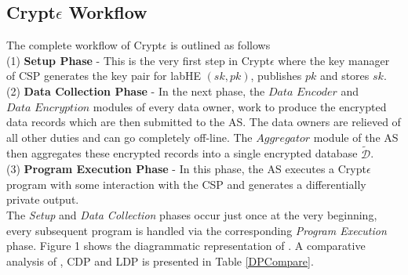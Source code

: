 \subsection{Crypt$\epsilon$ Workflow}
The complete workflow of Crypt$\epsilon$ is outlined as follows\\(1) \textbf{ Setup Phase} - This is the very first step in Crypt$\epsilon$ where the key manager of \textsf{CSP} generates the key pair for labHE $(sk,pk)$, publishes $pk$ and stores $sk$. \\(2) \textbf{ Data Collection Phase }- In the next phase, the $\textit{Data 
Encoder}$ and $\textit{Data Encryption}$ modules of every data owner, work to produce the encrypted data records which are then submitted to the \textsf{AS}. The data owners are relieved of all other duties and can go completely off-line. The $\textit{Aggregator}$ module of the \textsf{AS} then aggregates these encrypted records into a single encrypted database $\boldsymbol{\tilde{\mathcal{D}}}$. \\(3) \textbf{ Program Execution Phase} - In this phase, the \textsf{AS} executes a Crypt$\epsilon$ program with some interaction with the \textsf{CSP}  and generates a differentially private output.  \\
The \emph{Setup} and \emph{Data Collection} phases occur just once at the very beginning, every subsequent program  is handled via the corresponding  \emph{Program Execution} phase. Figure 1 shows the diagrammatic representation of \system. A comparative analysis of \system, \textsf{CDP} and \textsf{LDP} is presented in  Table \ref{DPCompare}.
\begin{table}[h!]
\centering
\caption {Comparative analysis of the different DP models}
\label{DPCompare}
\end{table}
